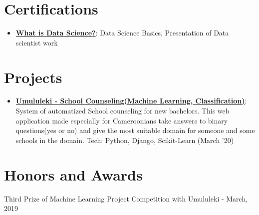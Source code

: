 \documentclass[a4paper,20pt]{article}
\newcommand{\resumeItem}[2]{
  \item\small{
    \textbf{#1}{: #2 \vspace{-2pt}}
  }
}
\newcommand{\resumeSubItem}[2]{\resumeItem{#1}{#2}\vspace{-3pt}}
\newcommand{\resumeSubHeadingListStart}{\begin{itemize}[leftmargin=*]}
\newcommand{\resumeSubHeadingListEnd}{\end{itemize}}
\begin{document}
\section{Certifications}
\resumeSubHeadingListStart
\resumeSubItem{\href{https://coursera.org/share/73ede1702c02e01a73358d0f2346f52d}{What is Data Science?}}{Data Science Basics, Presentation of Data scientist work}
\resumeSubHeadingListEnd

\vspace{5pt}
\section{Projects}
\resumeSubHeadingListStart
\resumeSubItem{\href{https://github.com/Hafro05/umululeki}{Umululeki - School Counseling(Machine Learning, Classification)}}{ System of automatized School counseling for new bachelors. This web application made especially for Cameroonians take answers to binary questions(yes or no) and give the most suitable domain for someone and some schools in the domain. Tech: Python, Django, Scikit-Learn (March '20)}
\vspace{2pt}
\resumeSubHeadingListEnd
\vspace{5pt}
\section{Honors and Awards}
\begin{description}[font=$\bullet$]
\item {Third Prize of Machine Learning Project Competition with Umululeki - March, 2019}
\vspace{5pt}

\end{description}
\end{document}

